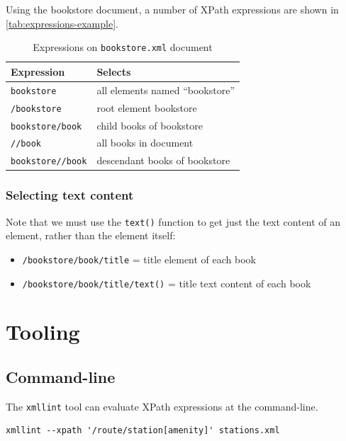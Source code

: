 \documentclass{pgnotes}
\begin{document}
Using the bookstore document, a number of XPath expressions are shown in \autoref{tab:expressions-example}. 

\begin{table}[htbp]
  \centering
  \begin{tabular}{l l}
    \toprule
    \textbf{Expression} & \textbf{Selects} \\
    \midrule
    \texttt{bookstore} & all elements named ``bookstore'' \\
    \texttt{/bookstore} & root element bookstore \\
    \texttt{bookstore/book} & child books of bookstore \\
    \texttt{//book} & all books in document \\
    \texttt{bookstore//book} & descendant books of bookstore\\
    \bottomrule
  \end{tabular}
  \caption{Expressions on \texttt{bookstore.xml} document}
  \label{tab:expressions-example}
\end{table}


\subsubsection{Selecting text content}

Note that we must use the \texttt{text()} function to get just the text content of an element, rather than the element itself:
\begin{itemize}
\item \texttt{/bookstore/book/title} = title element of each book
\item \texttt{/bookstore/book/title/text()} = title text content of each book
\end{itemize}

\section{Tooling}

\subsection{Command-line}

The \texttt{xmllint} tool can evaluate XPath expressions at the command-line.

\begin{verbatim}
xmllint --xpath '/route/station[amenity]' stations.xml
\end{verbatim}
\end{document}
